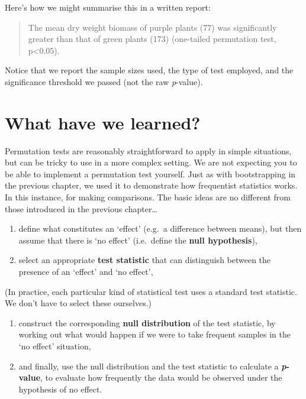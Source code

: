 \documentclass[]{book}
\begin{document}
Here's how we might summarise this in a written report:

\begin{quote}
The mean dry weight biomass of purple plants (77) was significantly
greater than that of green plants (173) (one-tailed permutation test,
p\textless{}0.05).
\end{quote}

Notice that we report the sample sizes used, the type of test employed,
and the significance threshold we passed (not the raw \emph{p}-value).

\section{What have we learned?}\label{what-have-we-learned}

Permutation tests are reasonably straightforward to apply in simple
situations, but can be tricky to use in a more complex setting. We are
not expecting you to be able to implement a permutation test yourself.
Just as with bootstrapping in the previous chapter, we used it to
demonstrate how frequentist statistics works. In this instance, for
making comparisons. The basic ideas are no different from those
introduced in the previous chapter\ldots{}

\begin{enumerate}
\def\labelenumi{\arabic{enumi}.}
\item
  define what constitutes an `effect' (e.g.~a difference between means),
  but then assume that there is `no effect' (i.e.~define the
  \textbf{null hypothesis}),
\item
  select an appropriate \textbf{test statistic} that can distinguish
  between the presence of an `effect' and `no effect',
\end{enumerate}

(In practice, each particular kind of statistical test uses a standard
test statistic. We don't have to select these ourselves.)

\begin{enumerate}
\def\labelenumi{\arabic{enumi}.}
\setcounter{enumi}{2}
\item
  construct the corresponding \textbf{null distribution} of the test
  statistic, by working out what would happen if we were to take
  frequent samples in the `no effect' situation,
\item
  and finally, use the null distribution and the test statistic to
  calculate a \textbf{\emph{p}-value}, to evaluate how frequently the
  data would be observed under the hypothesis of no effect.
\end{enumerate}
\end{document}
